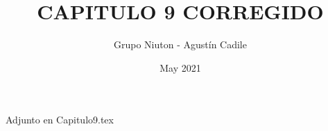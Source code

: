 \documentclass{article}
\title{CAPITULO 9 CORREGIDO}
\author{Grupo Niuton - Agustín Cadile}
\date{May 2021}
\begin{document}
\maketitle
Adjunto en Capitulo9.tex
\end{document}
